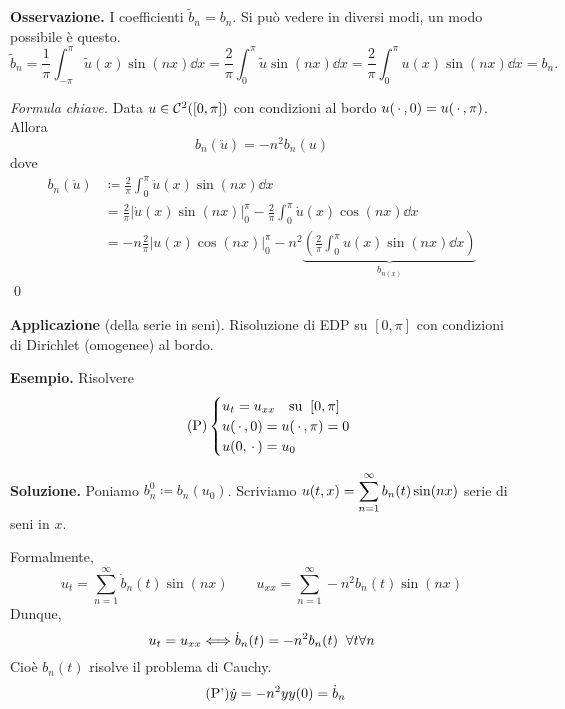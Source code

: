 \begin{itemize}
	\textbf{Osservazione.} I coefficienti $\tilde{b}_n = b_n$. Si può vedere in diversi modi, un modo possibile è questo.
	$$
		\tilde{b}_n = \frac{1}{\pi} \int_{-\pi}^{\pi} \tilde{u}(x) \sin(nx) \dd x 
		= \frac{2}{\pi} \int_{0}^{\pi} \tilde{u} \sin(nx) \dd x 
		= \frac{2}{\pi} \int_{0}^{\pi} u(x) \sin(nx) \dd x 
		= b_n.
	$$

	\textit{Formula chiave.} Data $u \in \mathcal{C}^2 ([0,\pi])$ con condizioni al bordo $u(\,\cdot\,, 0) = u(\,\cdot\,, \pi)$. 
	Allora
	$$
		b_n(\ddot u) = -n^2 b_n(u)
	$$
	dove 
	\begin{align*}
		b_n(\ddot u) & \coloneqq \frac{2}{\pi} \int_0^\pi \ddot u(x) \sin(nx) \dd x \\
		& = \frac{2}{\pi} \left| \dot u(x) \sin(nx) \right|_0^\pi - \frac{2}{\pi} \int_{0}^{\pi} \dot u(x) \cos(nx) \dd x \\
		& = -n \frac{2}{\pi} \left| u(x) \cos(nx) \right|_0^\pi - n^2  \underbrace{\left( \frac{2}{\pi} \int_{0}^{\pi} u(x) \sin(nx) \dd x \right)}_{b_{n(x)}}
	\end{align*}
	\qed

\end{itemize}


\textbf{Applicazione} (della serie in seni). Risoluzione di EDP su $[0,\pi]$ con condizioni di Dirichlet (omogenee) al bordo.

\textbf{Esempio.} Risolvere
%
\begin{equation}
\label{eq:24nov_problema_1} \tag{P}
	\begin{cases}
		u_t = u_{xx} \quad \text{su} \;\; [0,\pi] \\
		u(\,\cdot\,, 0) = u(\,\cdot\,,\pi) = 0 \\
		u(0,\,\cdot\,) = u_0
	\end{cases} 
\end{equation}

\textbf{Soluzione.} Poniamo $b_n^0 \coloneqq b_n (u_0)$.
Scriviamo $\displaystyle u(t,x) = \sum_{n=1}^{\infty} b_n(t) \sin(nx) $ serie di seni in $x$.

Formalmente,
%
$$
	u_t = \sum_{n=1}^\infty \dot b_n(t) \sin(nx) \qquad 
	u_{xx} = \sum_{n=1}^{\infty} -n^2 b_n(t) \sin(nx) 
$$
%
Dunque, 
%
$$
	u_t = u_{xx} \Longleftrightarrow \dot b_n(t) = -n^2 b_n(t) \;\; \forall t \forall n
$$
%
Cioè $b_n(t)$ risolve il problema di Cauchy.
\begin{equation}
\label{eq:24nov_problema_2} \tag{P'}
	\dot y = -n^2 y \\
	y(0) = \dot b_n
\end{equation}


